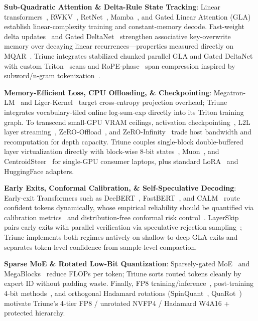 \documentclass[10pt,twocolumn,letterpaper]{article}
\begin{document}
\textbf{Sub-Quadratic Attention \& Delta-Rule State Tracking}: Linear transformers~\cite{katharopoulos2020transformers}, RWKV~\cite{peng2023rwkv}, RetNet~\cite{sun2023retentive}, Mamba~\cite{gu2023mamba}, and Gated Linear Attention (GLA)~\cite{yang2023gated} establish linear-complexity training and constant-memory decode. Fast-weight delta updates~\cite{schlag2021linear} and Gated DeltaNet~\cite{yang2024gateddeltanet} strengthen associative key-overwrite memory over decaying linear recurrences—properties measured directly on MQAR~\cite{arora2024zoology}. Triune integrates stabilized chunked parallel GLA and Gated DeltaNet with custom Triton~\cite{tillet2019triton} scans and RoPE-phase~\cite{su2024roformer} span compression inspired by subword/n-gram tokenization~\cite{sennrich2016bpe}.

\textbf{Memory-Efficient Loss, CPU Offloading, \& Checkpointing}: Megatron-LM~\cite{shoeybi2019megatron} and Liger-Kernel~\cite{liger2024} target cross-entropy projection overhead; Triune integrates vocabulary-tiled online log-sum-exp directly into its Triton training graph. To transcend small-GPU VRAM ceilings, activation checkpointing~\cite{chen2016training}, L2L layer streaming~\cite{pudipeddi2020l2l}, ZeRO-Offload~\cite{ren2021zerooffload}, and ZeRO-Infinity~\cite{rajbhandari2021zeroinfinity} trade host bandwidth and recomputation for depth capacity. Triune couples single-block double-buffered layer virtualization directly with block-wise 8-bit states~\cite{dettmers2022optimizers}, Muon~\cite{jordan2024muon}, and CentroidSteer~\cite{bhardwaj2026centroidsteer} for single-GPU consumer laptops, plus standard LoRA~\cite{hu2022lora} and HuggingFace adapters.

\textbf{Early Exits, Conformal Calibration, \& Self-Speculative Decoding}: Early-exit Transformers such as DeeBERT~\cite{xin2020deebert}, FastBERT~\cite{liu2020fastbert}, and CALM~\cite{schuster2022confident} route confident tokens dynamically, whose empirical reliability should be quantified via calibration metrics~\cite{guo2017calibration} and distribution-free conformal risk control~\cite{angelopoulos2021gentle,wilson1927probable}. LayerSkip~\cite{elhoushi2024layerskip} pairs early exits with parallel verification via speculative rejection sampling~\cite{leviathan2023fast,chen2023accelerating}; Triune implements both regimes natively on shallow-to-deep GLA exits and separates token-level confidence from sample-level compaction.

\textbf{Sparse MoE \& Rotated Low-Bit Quantization}: Sparsely-gated MoE~\cite{shazeer2017outrageously,fedus2022switch,jiang2024mixtral} and MegaBlocks~\cite{gale2023megablocks} reduce FLOPs per token; Triune sorts routed tokens cleanly by expert ID without padding waste. Finally, FP8 training/inference~\cite{micikevicius2022fp8}, post-training 4-bit methods~\cite{frantar2023gptq,lin2024awq}, and orthogonal Hadamard rotations (SpinQuant~\cite{liu2024spinquant}, QuaRot~\cite{ashkboos2024quarot}) motivate Triune's 4-tier FP8 / unrotated NVFP4 / Hadamard W4A16 + protected hierarchy.
\end{document}
